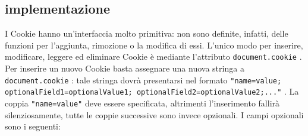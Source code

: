 \documentclass[a4paper, 12pt, twoside, openright]{book}
\begin{document}
\subsection{implementazione}
I Cookie hanno un'interfaccia molto primitiva: non sono definite, infatti, delle funzioni per l'aggiunta, rimozione o la modifica di essi. L'unico modo per inserire, modificare, leggere ed eliminare Cookie è mediante l'attributo \texttt{document.cookie} \cite{MDN_Web_docs:cookies}.\\
Per inserire un nuovo Cookie basta assegnare una nuova stringa a \linebreak\texttt{document.cookie} \cite{MDN_Web_docs:cookies}: tale stringa dovrà presentarsi nel formato \linebreak\texttt{"name=value; optionalField1=optionalValue1; optionalField2=\linebreak optionalValue2;..."} \cite{MDN_Web_docs:cookies}. La coppia \texttt{"name=value"} deve essere specificata, altrimenti l'inserimento fallirà silenziosamente, tutte le coppie successive sono invece opzionali. I campi opzionali sono i seguenti:
\end{document}

